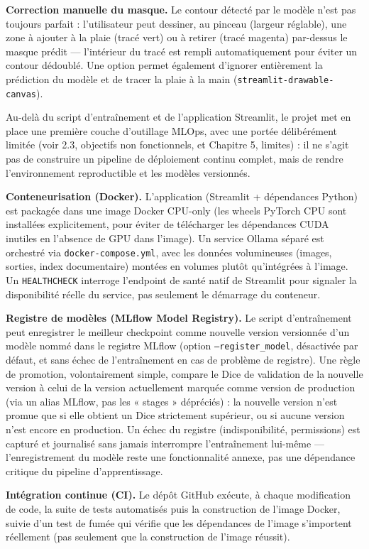 \documentclass[12pt,a4paper]{report}
\begin{document}
\textbf{Correction manuelle du masque.} Le contour détecté par le modèle n'est pas toujours parfait : l'utilisateur peut dessiner, au pinceau (largeur réglable), une zone à ajouter à la plaie (tracé vert) ou à retirer (tracé magenta) par-dessus le masque prédit --- l'intérieur du tracé est rempli automatiquement pour éviter un contour dédoublé. Une option permet également d'ignorer entièrement la prédiction du modèle et de tracer la plaie à la main (\texttt{streamlit-drawable-canvas}).

Au-delà du script d'entraînement et de l'application Streamlit, le projet met en place une première couche d'outillage MLOps, avec une portée délibérément limitée (voir 2.3, objectifs non fonctionnels, et Chapitre 5, limites) : il ne s'agit pas de construire un pipeline de déploiement continu complet, mais de rendre l'environnement reproductible et les modèles versionnés.

\textbf{Conteneurisation (Docker).} L'application (Streamlit + dépendances Python) est packagée dans une image Docker CPU-only (les wheels PyTorch CPU sont installées explicitement, pour éviter de télécharger les dépendances CUDA inutiles en l'absence de GPU dans l'image). Un service Ollama séparé est orchestré via \texttt{docker-compose.yml}, avec les données volumineuses (images, sorties, index documentaire) montées en volumes plutôt qu'intégrées à l'image. Un \texttt{HEALTHCHECK} interroge l'endpoint de santé natif de Streamlit pour signaler la disponibilité réelle du service, pas seulement le démarrage du conteneur.

\textbf{Registre de modèles (MLflow Model Registry).} Le script d'entraînement peut enregistrer le meilleur checkpoint comme nouvelle version versionnée d'un modèle nommé dans le registre MLflow (option \texttt{--register\_model}, désactivée par défaut, et sans échec de l'entraînement en cas de problème de registre). Une règle de promotion, volontairement simple, compare le Dice de validation de la nouvelle version à celui de la version actuellement marquée comme version de production (via un alias MLflow, pas les « stages » dépréciés) : la nouvelle version n'est promue que si elle obtient un Dice strictement supérieur, ou si aucune version n'est encore en production. Un échec du registre (indisponibilité, permissions) est capturé et journalisé sans jamais interrompre l'entraînement lui-même --- l'enregistrement du modèle reste une fonctionnalité annexe, pas une dépendance critique du pipeline d'apprentissage.

\textbf{Intégration continue (CI).} Le dépôt GitHub exécute, à chaque modification de code, la suite de tests automatisés puis la construction de l'image Docker, suivie d'un test de fumée qui vérifie que les dépendances de l'image s'importent réellement (pas seulement que la construction de l'image réussit).
\end{document}
